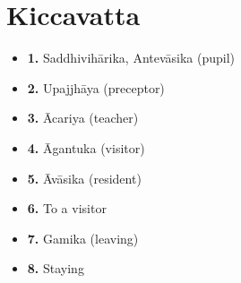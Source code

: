 \chapter{Kiccavatta}

\begin{itemize}
\tightlist
\item
  \textbf{1.} Saddhivihārika, Antevāsika (pupil)
\item
  \textbf{2.} Upajjhāya (preceptor)
\item
  \textbf{3.} Ācariya (teacher)
\item
  \textbf{4.} Āgantuka (visitor)
\item
  \textbf{5.} Āvāsika (resident)
\item
  \textbf{6.} To a visitor
\item
  \textbf{7.} Gamika (leaving)
\item
  \textbf{8.} Staying
\end{itemize}

